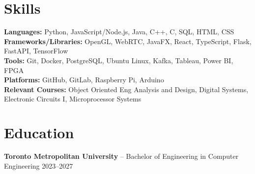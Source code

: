 \documentclass[11pt]{article}
\begin{document}
\section*{Skills}
\textbf{Languages:} Python, JavaScript/Node.js, Java, C++, C, SQL, HTML, CSS \\
\textbf{Frameworks/Libraries:} OpenGL, WebRTC, JavaFX, React, TypeScript, Flask, FastAPI, TensorFlow \\
\textbf{Tools:} Git, Docker, PostgreSQL, Ubuntu Linux, Kafka, Tableau, Power BI, FPGA \\
\textbf{Platforms:} GitHub, GitLab, Raspberry Pi, Arduino \\
\textbf{Relevant Courses:} Object Oriented Eng Analysis and Design, Digital Systems, Electronic Circuits I, Microprocessor Systems

\section*{Education}
\textbf{Toronto Metropolitan University} -- Bachelor of Engineering in Computer Engineering \hfill 2023--2027
\end{document}
